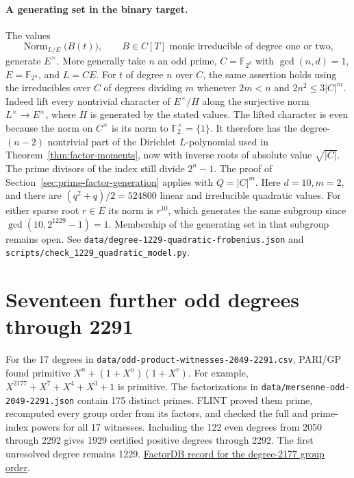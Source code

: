 \documentclass[11pt]{article}
\newcommand{\F}{\mathbb F_2}
\begin{document}
\paragraph{A generating set in the binary target.}
The values
\[
  \operatorname{Norm}_{L/E}\bigl(B(t)\bigr),\qquad
   B\in C[T]\text{ monic irreducible of degree one or two},
\]
generate \(E^\times\). More generally take \(n\) an odd prime,
\(C=\mathbb F_{2^d}\) with \(\gcd(n,d)=1\),
\(E=\mathbb F_{2^n}\), and \(L=CE\). For \(t\) of degree \(n\) over
\(C\), the same assertion holds using the irreducibles over \(C\) of
degrees dividing \(m\) whenever \(2m<n\) and \(2n^2\le3|C|^m\).
Indeed lift every nontrivial character of \(E^\times/H\) along the
surjective norm \(L^\times\to E^\times\), where \(H\) is generated by
the stated values. The lifted character is even because the norm on
\(C^\times\) is its norm to \(\F^\times=\{1\}\). It therefore has
the degree-\((n-2)\) nontrivial part of the Dirichlet \(L\)-polynomial
used in Theorem~\ref{thm:factor-moments}, now with inverse roots of
absolute value \(\sqrt{|C|}\). The prime divisors of the index still
divide \(2^n-1\). The proof of Section~\ref{sec:prime-factor-generation}
applies with \(Q=|C|^m\). Here \(d=10,m=2\), and there are
\((q^2+q)/2=524800\) linear and irreducible quadratic values.
For either sparse root \(r\in E\) its norm is \(r^{10}\), which
generates the same subgroup since \(\gcd(10,2^{1229}-1)=1\).
Membership of the generating set in that subgroup remains open.
See \nolinkurl{data/degree-1229-quadratic-frobenius.json} and
\nolinkurl{scripts/check_1229_quadratic_model.py}.

\section{Seventeen further odd degrees through 2291}\label{sec:odd-2291}
For the 17 degrees in \nolinkurl{data/odd-product-witnesses-2049-2291.csv},
PARI/GP found primitive \(X^n+(1+X^u)(1+X^v)\). For example,
\(X^{2177}+X^7+X^4+X^3+1\) is primitive. The factorizations in
\nolinkurl{data/mersenne-odd-2049-2291.json} contain 175 distinct
primes. FLINT proved them prime, recomputed every group order from
its factors, and checked the full and prime-index powers for all
17 witnesses. Including the 122 even degrees from 2050 through 2292
gives 1929 certified positive degrees through 2292. The first
unresolved degree remains 1229.
\href{https://factordb.com/index.php?query=2%5E2177-1}{FactorDB record
for the degree-2177 group order}.
\end{document}

